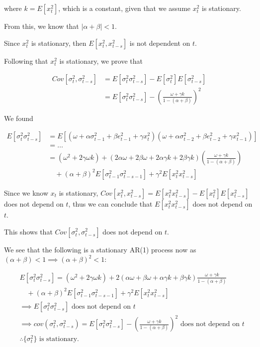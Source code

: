 \documentclass{article}
\begin{document}
where $k = E[x_t^2]$, which is a constant, given that we assume $x_t^2$ is stationary.

From this, we know that $|\alpha + \beta| < 1$.

Since $x_t^2$ is stationary, then $E[x_t^2, x_{t-s}^2]$ is not dependent on $t$.

Following that $x_t^2$ is stationary, we prove that

\[
\begin{split}
Cov[\sigma_t^2,\sigma_{t-s}^2] &= E[\sigma_t^2 \sigma_{t-s}^2] - E[\sigma_t^2]E[\sigma_{t-s}^2] \\
&= E[\sigma_t^2 \sigma_{t-s}^2] - \left(\frac{\omega + \gamma k}{1-(\alpha+\beta)}\right)^2
\end{split}
\]

We found 

\[
\begin{split}
E[\sigma_t^2 \sigma_{t-s}^2] &= E[(\omega + \alpha \sigma_{t-1}^2 + \beta e_{t-1}^2 + \gamma x_t^2)(\omega + \alpha \sigma_{t-2}^2 + \beta e_{t-2}^2 + \gamma x_{t-1}^2)] \\
&= \ldots \\
&= (\omega^2 + 2\gamma \omega k) + (2 \alpha \omega + 2 \beta \omega + 2 \alpha \gamma k + 2 \beta \gamma k) \left(\frac{\omega + \gamma k}{1-(\alpha+\beta)}\right) \\
&\quad + (\alpha + \beta)^2 E[\sigma_{t-1}^2 \sigma_{t-s-1}^2] + \gamma^2 E[x_t^2 x_{t-s}^2]
\end{split}
\]

Since we know $x_t$ is stationary, $Cov[x_t^2,x_{t-s}^2] = E[x_t^2 x_{t-s}^2] - E[x_t^2]E[x_{t-s}^2]$ does not depend on $t$, thus we can conclude that $E[x_t^2 x_{t-s}^2]$ does not depend on $t$.

This shows that $Cov[\sigma_t^2,\sigma_{t-s}^2]$ does not depend on $t$.

We see that the following is a stationary AR(1) process now as $(\alpha+\beta) < 1 \implies  (\alpha+\beta)^2 < 1$:

\[
\begin{split}
&E[\sigma_t^2 \sigma_{t-s}^2] = (\omega^2 + 2\gamma \omega k) + 2(\alpha\omega + \beta\omega + \alpha\gamma k + \beta\gamma k) \frac{\omega+\gamma k}{1-(\alpha+\beta)} \\
&\quad + (\alpha+\beta)^2 E[\sigma_{t-1}^2\sigma_{t-s-1}^2] + \gamma^2 E[x_t^2 x_{t-s}^2] \\
&\implies E[\sigma_t^2 \sigma_{t-s}^2] \text{ does not depend on }t \\
&\implies cov(\sigma_t^2, \sigma_{t-s}^2) = E[\sigma_t^2 \sigma_{t-s}^2] - \left(\frac{\omega+\gamma k}{1-(\alpha+\beta)}\right)^2 \text{ does not depend on }t \\
&\therefore \{\sigma_t^2\} \text{ is stationary}.
\end{split}
\]
\end{document}

